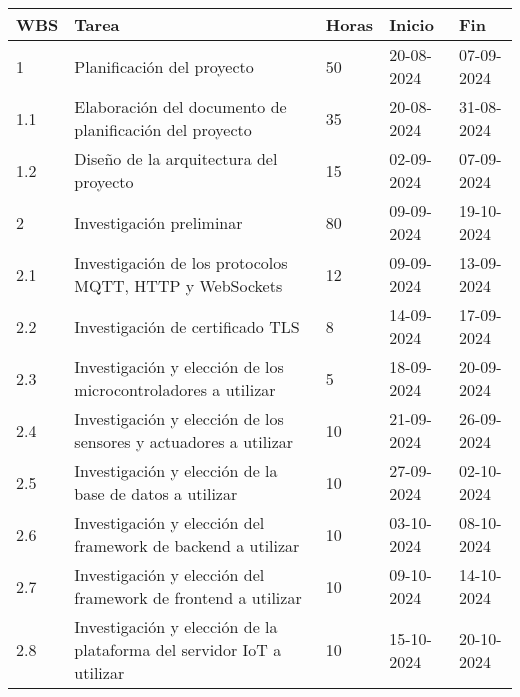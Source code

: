 \begin{table}[ht]
	\begin{tabularx}{\linewidth}{|p{1cm}|p{10cm}|p{1cm}|p{1.8cm}|p{1.8cm}|}
		\hline
		\rowcolor[HTML]{C0C0C0}
		WBS  & Tarea                                                                                                    & Horas & Inicio     & Fin        \\ \hline
		1    & Planificación del proyecto                                                                               & 50    & 20-08-2024 & 07-09-2024 \\ \hline
		1.1  & Elaboración del documento de planificación del proyecto                                                  & 35    & 20-08-2024 & 31-08-2024 \\ \hline
		1.2  & Diseño de la arquitectura del proyecto                                                                   & 15    & 02-09-2024 & 07-09-2024 \\ \hline
		2    & Investigación preliminar                                                                                 & 80    & 09-09-2024 & 19-10-2024 \\ \hline
		2.1  & Investigación de los protocolos MQTT, HTTP y WebSockets                                                  & 12    & 09-09-2024 & 13-09-2024 \\ \hline
		2.2  & Investigación de certificado TLS                                                                         & 8     & 14-09-2024 & 17-09-2024 \\ \hline
		2.3  & Investigación y elección de los microcontroladores a utilizar                                            & 5     & 18-09-2024 & 20-09-2024 \\ \hline
		2.4  & Investigación y elección de los sensores y actuadores a utilizar                                         & 10    & 21-09-2024 & 26-09-2024 \\ \hline
		2.5  & Investigación y elección de la base de datos a utilizar                                                  & 10    & 27-09-2024 & 02-10-2024 \\ \hline
		2.6  & Investigación y elección del framework de backend a utilizar                                             & 10    & 03-10-2024 & 08-10-2024 \\ \hline
		2.7  & Investigación y elección del framework de frontend a utilizar                                            & 10    & 09-10-2024 & 14-10-2024 \\ \hline
		2.8  & Investigación y elección de la plataforma del servidor IoT a utilizar                                    & 10    & 15-10-2024 & 20-10-2024 \\ \hline

\end{tabularx}
\end{table}
